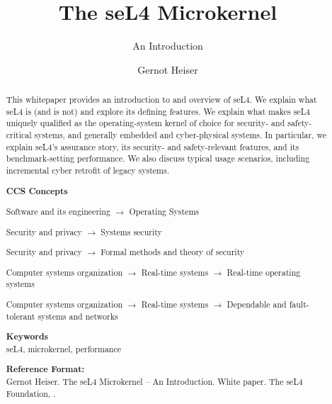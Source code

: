 \documentclass[english,a4paper,12pt\ifDraft,draft\fi]{report}
\begin{document}
  \renewcommand{\chapterautorefname}{Chapter}
  \renewcommand{\sectionautorefname}{Section}
  \renewcommand{\subsectionautorefname}{Section}
  \renewcommand{\subsubsectionautorefname}{Section}
  \renewcommand{\appendixautorefname}{Appendix}
  \renewcommand{\Hfootnoteautorefname}{Footnote}
  \newcommand{\Htextbf}[1]{\textbf{\hyperpage{#1}}}

  \renewcommand{\topfraction}{0.9}
  \renewcommand{\bottomfraction}{0.9}

  \title{The seL4 Microkernel}
  \subtitle{An Introduction}

  \author{Gernot Heiser}
  \date{}

  \thispagestyle{plain}
  \maketitle 
  \doCopyright[2020]

\begin{abstract}
    This whitepaper provides an introduction to and overview of
    seL4. We explain what seL4
    is (and is not) and explore its defining features. We explain what
    makes seL4
    uniquely qualified as the operating-system kernel of choice for
    security- and safety-critical systems, and generally embedded and
    cyber-physical systems. In particular, we explain
    seL4's assurance story, its security- and safety-relevant
    features, and its benchmark-setting performance. We also discuss
    typical usage scenarios, including incremental cyber retrofit of
    legacy systems.

    \vspace{6ex}
    \setcounter{page}{0}

    \newcommand{\Sub}{{\boldmath\(\rightarrow\)}\xspace}
    \textbf{CCS Concepts}
    \begin{compactitem}
    \item Software and its engineering \Sub Operating Systems
    \item Security and privacy \Sub Systems security
    \item Security and privacy \Sub Formal methods and theory of security
    \item Computer systems organization \Sub Real-time systems \Sub
      Real-time operating systems
    \item Computer systems organization \Sub Real-time systems \Sub
      Dependable and fault-tolerant systems and networks
    \end{compactitem}
    \vspace{2ex}

    \textbf{Keywords}\\
    seL4, microkernel, performance
    \vspace{2ex}

    \textbf{Reference Format:}\\
    Gernot Heiser. The seL4 Microkernel -- An Introduction. White
    paper. The seL4 Foundation, \thedocversion.
  \end{abstract}
\end{document}
